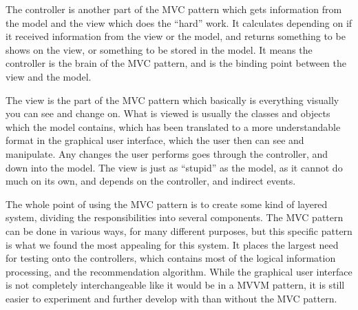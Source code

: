 The controller is another part of the MVC pattern which gets information from the model and the view which does the “hard” work. It calculates depending on if it received information from the view or the model, and returns something to be shows on the view, or something to be stored in the model. It means the controller is the brain of the MVC pattern, and is the binding point between the view and the model.

The view is the part of the MVC pattern which basically is everything visually you can see and change on. What is viewed is usually the classes and objects which the model contains, which has been translated to a more understandable format in the graphical user interface, which the user then can see and manipulate. Any changes the user performs goes through the controller, and down into the model. The view is just as “stupid” as the model, as it cannot do much on its own, and depends on the controller, and indirect events.

The whole point of using the MVC pattern is to create some kind of layered system, dividing the responsibilities into several components. The MVC pattern can be done in various ways, for many different purposes, but this specific pattern is what we found the most appealing for this system. It places the largest need for testing onto the controllers, which contains most of the logical information processing, and the recommendation algorithm. While the graphical user interface is not completely interchangeable like it would be in a MVVM pattern, it is still easier to experiment and further develop with than without the MVC pattern.
